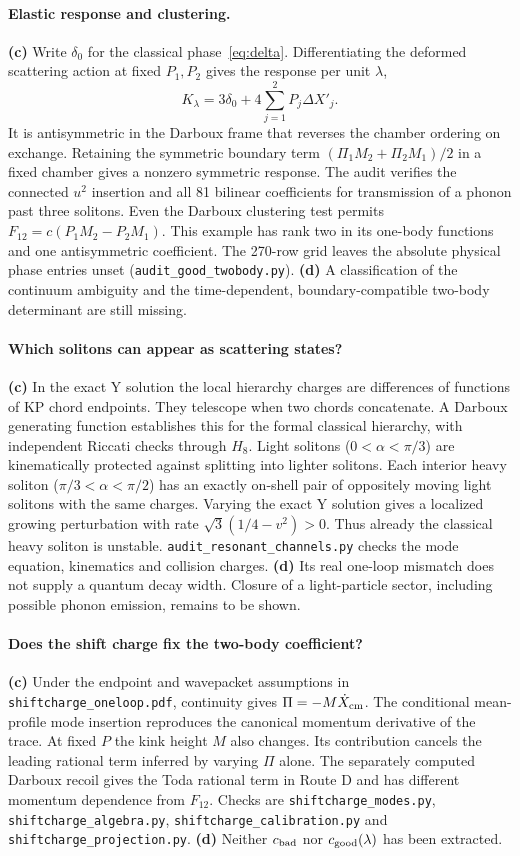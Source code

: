 \documentclass[11pt,a4paper]{article}
\newcommand{\Lc}{\textsf{\textbf{(c)}}\xspace}
\newcommand{\Ld}{\textsf{\textbf{(d)}}\xspace}
\newcommand{\file}[1]{\nolinkurl{#1}}
\theoremstyle{remark}\newtheorem{remark}[proposition]{Remark}
\begin{document}
\paragraph{Elastic response and clustering.}
\Lc Write $\delta_0$ for the classical phase~\eqref{eq:delta}. Differentiating
the deformed scattering action at fixed $P_1,P_2$ gives the response per
unit $\lambda$,
\[
 K_\lambda=3\delta_0+4\sum_{j=1}^2 P_j\Delta X'_j .
\]
It is antisymmetric in the Darboux frame that reverses the chamber ordering
on exchange. Retaining the symmetric boundary term
$(\Pi_1M_2+\Pi_2M_1)/2$ in a fixed chamber gives a nonzero symmetric
response. The audit verifies the connected $u^2$ insertion and all 81
bilinear coefficients for transmission of a phonon past three solitons.
Even the Darboux clustering test permits
$F_{12}=c(P_1M_2-P_2M_1)$. This example has rank two in its one-body
functions and one antisymmetric coefficient. The 270-row grid leaves the
absolute physical phase entries unset (\file{audit_good_twobody.py}).
\Ld A classification of the continuum ambiguity and the time-dependent,
boundary-compatible two-body determinant are still missing.

\paragraph{Which solitons can appear as scattering states?}
\Lc In the exact Y solution the local hierarchy charges are differences of
functions of KP chord endpoints. They telescope when two chords concatenate.
A Darboux generating function establishes this for the formal classical
hierarchy, with independent Riccati checks through $H_8$. Light solitons
($0<\alpha<\pi/3$) are kinematically protected against splitting into
lighter solitons. Each interior heavy soliton ($\pi/3<\alpha<\pi/2$) has
an exactly on-shell pair of oppositely moving light solitons with the same
charges. Varying the exact Y solution gives a localized growing perturbation
with rate $\sqrt{3}(1/4-v^2)>0$. Thus already the classical heavy soliton is
unstable. \file{audit_resonant_channels.py} checks the mode equation,
kinematics and collision charges. \Ld Its real one-loop mismatch does not
supply a quantum decay width. Closure of a light-particle sector, including
possible phonon emission, remains to be shown.

\paragraph{Does the shift charge fix the two-body coefficient?}
\Lc Under the endpoint and wavepacket assumptions in
\file{shiftcharge_oneloop.pdf}, continuity gives $\Pi=-M\dot X_{\rm cm}$.
The conditional mean-profile mode insertion reproduces the canonical
momentum derivative of the trace. At fixed $P$ the kink height $M$ also
changes. Its contribution cancels the leading rational term inferred by
varying $\Pi$ alone. The separately computed Darboux recoil gives the
Toda rational term in Route D and has different momentum dependence from
$F_{12}$. Checks are \file{shiftcharge_modes.py},
\file{shiftcharge_algebra.py}, \file{shiftcharge_calibration.py} and
\file{shiftcharge_projection.py}. \Ld Neither $c_{\rm bad}$ nor
$c_{\rm good}(\lambda)$ has been extracted.
\end{document}
